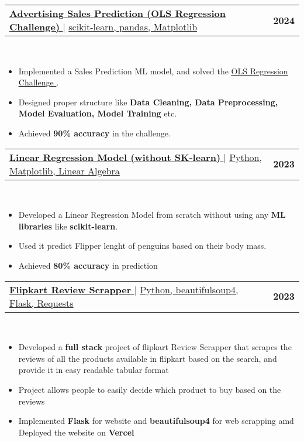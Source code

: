 \documentclass[letterpaper,11pt]{article}
\makeatletter
\newcommand{\resumeItem}[1]{
  \item\small{
    {#1 \vspace{-2pt}}
  }
}
\newcommand{\resumeProjectHeading}[2]{
    \item
    \begin{tabular*}{1.001\textwidth}{l@{\extracolsep{\fill}}r}
      \small#1 & \textbf{\small #2}\\
    \end{tabular*}\vspace{-7pt}
}
\newcommand{\resumeItemListStart}{\begin{itemize}}
\newcommand{\resumeItemListEnd}{\end{itemize}\vspace{-5pt}}
\makeatother
\begin{document}
          
      \resumeProjectHeading
          {\href{https://github.com/typhonshambo/Advertising-Sales-Prediction}{\textbf{\large{\underline{\textbf{Advertising Sales Prediction (OLS Regression Challenge)}}}} \href{Project Link}{\raisebox{-0.1\height}\faExternalLink }} $|$ \large{\underline{scikit-learn, pandas, Matplotlib}}}{2024}\\
          \resumeItemListStart
            \resumeItem{\normalsize{Implemented a Sales Prediction ML model, and solved the {\href{https://data.world/nrippner/ols-regression-challenge}{{\underline{OLS Regression Challenge}} \href{Project Link}{\raisebox{-0.1\height}\faExternalLink }}.}}}
            \resumeItem{\normalsize{Designed proper structure like \textbf{Data Cleaning, Data Preprocessing, Model Evaluation, Model Training} etc.}}
            \resumeItem{\normalsize{Achieved \textbf{90\% accuracy} in the challenge.}}
          \resumeItemListEnd
          \vspace{-13pt}
          
      \resumeProjectHeading
          {\href{https://github.com/typhonshambo/linear-regression-model}{\textbf{\large{\underline{\textbf{Linear Regression Model (without SK-learn)}}}} \href{Project Link}{\raisebox{-0.1\height}\faExternalLink }} $|$ \large{\underline{Python, Matplotlib, Linear Algebra}}}{2023}\\
          \resumeItemListStart
            \resumeItem{\normalsize{Developed a Linear Regression Model from scratch without using any \textbf{ML libraries} like \textbf{scikit-learn}.}}
            \resumeItem{\normalsize{Used it predict Flipper lenght of penguins based on their body mass.}}
            \resumeItem{\normalsize{Achieved \textbf{80\% accuracy} in prediction}}
          \resumeItemListEnd
          
      \resumeProjectHeading
          {\href{https://github.com/typhonshambo/flipkart-review-scrapperl}{\textbf{\large{\underline{\textbf{Flipkart Review Scrapper}}}} \href{Project Link}{\raisebox{-0.1\height}\faExternalLink }} $|$ \large{\underline{Python, beautifulsoup4, Flask, Requests}}}{2023}\\
          \resumeItemListStart
            \resumeItem{\normalsize{Developed a \textbf{full stack} project of flipkart Review Scrapper that scrapes the reviews of all the products available in flipkart based on the search, and provide it in easy readable tabular format}}
            \resumeItem{\normalsize{Project allows people to easily decide which product to buy based on the reviews}}
            \resumeItem{\normalsize{Implemented \textbf{Flask} for website and \textbf{beautifulsoup4} for web scrapping amd Deployed the website on \textbf{Vercel}}}
          \resumeItemListEnd
          
\end{document}
